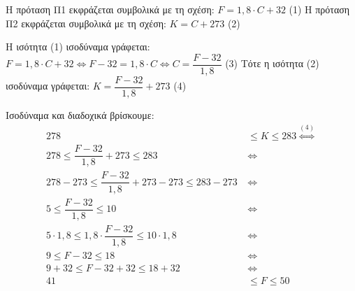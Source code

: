 
\begin{alist}
\item Η πρόταση Π1 εκφράζεται συμβολικά με τη σχέση:
$F = 1,8 \cdot C + 32$ (1)
Η πρόταση Π2 εκφράζεται συμβολικά με τη σχέση:
$K = C + 273$ (2)

\item Η ισότητα (1) ισοδύναμα γράφεται:
$F = 1,8 \cdot C + 32 \Leftrightarrow F - 32 = 1,8 \cdot C \Leftrightarrow C = \dfrac{F - 32}{1,8}$ (3)
Τότε η ισότητα (2) ισοδύναμα γράφεται:
$K = \dfrac{F - 32}{1,8} + 273$ (4)

\item Ισοδύναμα και διαδοχικά βρίσκουμε:
\begin{align*}
278 &\le K \le 283 \overset{(4)}{\Leftrightarrow} \\
278 \le \dfrac{F - 32}{1,8} + 273 \le 283 \ &\Leftrightarrow \\
278 - 273 \le \dfrac{F - 32}{1,8} + 273 - 273 \le 283 - 273 \ &\Leftrightarrow \\
5 \le \dfrac{F - 32}{1,8} \le 10 \ &\Leftrightarrow \\
5 \cdot 1,8 \le 1,8 \cdot \dfrac{F - 32}{1,8} \le 10 \cdot 1,8 \ &\Leftrightarrow \\
9 \le F - 32 \le 18 \ &\Leftrightarrow \\
9 + 32 \le F - 32 + 32 \le 18 + 32 \ &\Leftrightarrow \\
41 &\le F \le 50
\end{align*}
\end{alist}

